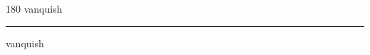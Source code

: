 
\begin{frame}
\begin{center}
\begin{turn}{180}
{\fontsize{2.5cm}{1em}\selectfont vanquish}
\end{turn}
\vspace{1em}\par  
\hrule
\vspace{1em}\par  
{\fontsize{2.5cm}{1em}\selectfont vanquish}
\end{center}
\end{frame}
